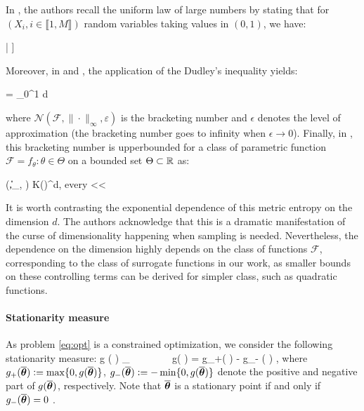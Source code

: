 \documentclass[11pt]{article}
\makeatletter
\theoremstyle{t}
\DeclareRobustCommand*\cal{\@fontswitch\relax\mathcal}
\makeatother
\begin{document}
In \citep{vershynin2018high}, the authors recall the uniform law of large numbers by stating that for $(X_i, i \in \llbracket 1, M \rrbracket)$ random variables taking values in $(0,1)$, we have:

\beq
\EE \left[\underset{f \in \mathcal{F}}{ \sup } \left|\frac{1}{M} \sum_{i=1}^{M} f\left(X_{i}\right)-\EE[f(X)]\right| \right] \leq {}
\eeq

Moreover, in \citep{vershynin2018high} and \citep{wainwright2019high}, the application of the Dudley's inequality yields:

\beq
\EE {}=\EE {} \leq {} \int_{0}^{1}  d \varepsilon
\eeq

where $\mathcal{N}\left(\mathcal{F},\|\cdot\|_{\infty}, \varepsilon\right)$ is the bracketing number and $\epsilon$ denotes the level of approximation (the bracketing number goes to infinity when $\epsilon  \to 0$). Finally, in \citep{van2000asymptotic}, this bracketing number is upperbounded for a class of parametric function $ \mathcal{F}= {f_{\theta}: \theta \in \Theta}$ on a bounded set $\Theta \subset \rset$ as:


\beq
{}\left(,\|\cdot\|_{\infty}, \varepsilon\right) \leq K\left(\right)^{d}, \quad \textrm{every} <\varepsilon< \Theta
\eeq

It is worth contrasting the exponential dependence of this metric entropy on the dimension $d$. 
The authors acknowledge that this is a dramatic manifestation of the curse of dimensionality happening when sampling is needed.
Nevertheless, the dependence on the dimension highly depends on the class of functions $\mathcal{F}$, corresponding to the class of surrogate functions in our work, as smaller bounds on these controlling terms can be derived for simpler class, such as quadratic functions.

\paragraph{Stationarity measure} As problem \eqref{eq:opt} is a constrained optimization, we consider the following stationarity measure:
\beq \label{eq:stationary_meas}
g ( \op ) \eqdef \inf_{ \param \in \Param } \frac{ {\cal L}'( \op , \param - \op  ) }{ \| \op - \param \|}~~~~~~~~g( \op )  = g_+( \op )  - g_- ( \op ) \eqsp,
\eeq
where  $g_+ ( \op ) \eqdef \max\{ 0, g(\op) \}$, $g_- ( \op )  \eqdef - \min\{0, g(\op)\}$ denote the positive and negative part of $g( \op ) $, respectively.
Note that $\op$ is a stationary point if and only if $g_-( \op ) = 0$ \citep{fletcher2002global}.
\end{document}
